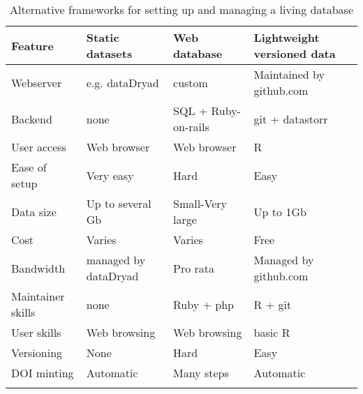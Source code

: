 \documentclass[a4paper,11pt]{article}
\begin{document}
\begin{table}[h!]
\centering
\caption{Alternative frameworks for setting up and managing a living database}
{\footnotesize
\vspace{1cm}
  \begin{tabular}{p{2.5cm}p{3.5cm}p{3.5cm}p{4cm}}
  \hline
  \textbf{Feature} & \textbf{Static datasets}& \textbf{Web database} & \textbf{Lightweight versioned data}\\
  \hline
   Webserver        & e.g. dataDryad & custom                          &  Maintained by github.com\\
   Backend          & none & SQL + Ruby-on-rails 			& git + datastorr \\
   User access      & Web browser & Web browser 				    & R \\
   Ease of setup    & Very easy & Hard 							& Easy\\ %
   Data size        & Up to several Gb & Small-Very large 				& Up to 1Gb\\
   Cost             & Varies & Varies  						& Free \\
   Bandwidth        &managed by dataDryad & Pro rata 						& Managed by github.com\\
   Maintainer skills &none & Ruby + php 					& R + git \\
   User skills      &Web browsing& Web browsing  					& basic R \\
   Versioning       &None& Hard 							& Easy \\
   DOI minting      &Automatic & Many steps 					& Automatic \\
  \hline 
  \\
 
  \end{tabular}
  } 
\label{tab:sql_v_versioneddata}
\end{table}

\newpage
\end{document}
